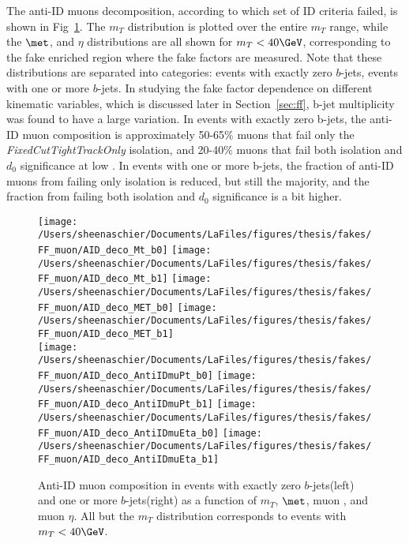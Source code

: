 The anti-ID muons decomposition, according to which set of ID criteria failed, is shown in Fig~\ref{fig:muDeco}. The $m_{T}$ distribution is plotted over the entire $m_{T}$ range, while the $\met$, \pt{} and $\eta$ distributions are all shown for $m_{T} <40\GeV$, corresponding to the fake enriched region where the fake factors are measured.  Note that these distributions are separated into categories: events with exactly zero $b$-jets, events with one or more $b$-jets.  In studying the fake factor dependence on different kinematic variables, which is discussed later in Section~\ref{sec:ff}, b-jet multiplicity was found to have a large variation.  In events with exactly zero b-jets, the anti-ID muon composition is approximately 50-65$\%$ muons that fail only the \textit{FixedCutTightTrackOnly} isolation, and 20-40$\%$ muons that fail both isolation and $d_0$ significance at low \pt.  In events with one or more b-jets, the fraction of anti-ID muons from failing only isolation is reduced, but still the majority, and the fraction from failing both isolation and $d_0$ significance is a bit higher.     
\begin{figure}
        \centering
        \texttt{[image: /Users/sheenaschier/Documents/LaFiles/figures/thesis/fakes/FF\_muon/AID\_deco\_Mt\_b0]}
                \texttt{[image: /Users/sheenaschier/Documents/LaFiles/figures/thesis/fakes/FF\_muon/AID\_deco\_Mt\_b1]}
        \texttt{[image: /Users/sheenaschier/Documents/LaFiles/figures/thesis/fakes/FF\_muon/AID\_deco\_MET\_b0]}
        \texttt{[image: /Users/sheenaschier/Documents/LaFiles/figures/thesis/fakes/FF\_muon/AID\_deco\_MET\_b1]}\\
                \texttt{[image: /Users/sheenaschier/Documents/LaFiles/figures/thesis/fakes/FF\_muon/AID\_deco\_AntiIDmuPt\_b0]}
                        \texttt{[image: /Users/sheenaschier/Documents/LaFiles/figures/thesis/fakes/FF\_muon/AID\_deco\_AntiIDmuPt\_b1]}
        \texttt{[image: /Users/sheenaschier/Documents/LaFiles/figures/thesis/fakes/FF\_muon/AID\_deco\_AntiIDmuEta\_b0]}
        \texttt{[image: /Users/sheenaschier/Documents/LaFiles/figures/thesis/fakes/FF\_muon/AID\_deco\_AntiIDmuEta\_b1]}\\
        \caption{Anti-ID muon composition in events with exactly zero $b$-jets(left) and one or more $b$-jets(right) as a function of $m_{T}$, $\met$, muon \pt{}, and muon $\eta$. All but the $m_{T}$ distribution corresponds to events with $m_{T} < 40\GeV$.}
        \label{fig:muDeco}
\end{figure}


